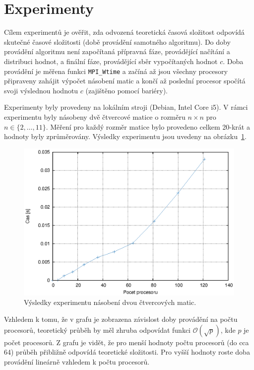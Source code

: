 \documentclass[a4paper,12pt]{article}
\begin{document}
\section{Experimenty}
Cílem experimentů je ověřit, zda odvozená teoretická časová složitost odpovídá skutečné časové složitosti (době 
provádění samotného algoritmu). Do doby provádění algoritmu není započítaná přípravná fáze, provádějící načítání a
distribuci hodnot, a finální fáze, provádějící sběr vypočítaných hodnot $c$. Doba provádění je měřena funkci \texttt{MPI\_Wtime} 
a začíná až jsou všechny procesory připraveny zahájit výpočet násobení matic a končí až poslední procesor spočítá svoji 
výslednou hodnotu $c$ (zajištěno pomocí bariéry).

Experimenty byly provedeny na lokálním stroji (Debian, Intel Core i5). V rámci experimentu byly násobeny dvě čtvercové matice
o rozměru $n\times n$ pro $n \in \{2,\dots,11\}$. Měření pro každý rozměr matice bylo provedeno celkem 20-krát a hodnoty byly 
zprůměrovány. Výsledky experimentu jsou uvedeny na obrázku~\ref{fig:exp1}.

\begin{figure}[h]
  \centering
  \includegraphics{Figures/quare.eps}
  \caption{Výsledky experimentu násobení dvou čtvercových matic.}
  \label{fig:exp1}
\end{figure}

Vzhledem k tomu, že v grafu je zobrazena závislost doby provádění na počtu procesorů, teoretický průběh by měl zhruba odpovídat
funkci $\mathcal{O}(\sqrt{p})$, kde $p$ je počet procesorů. Z grafu je vidět, že pro menší hodnoty počtu procesorů (do cca 64)
průběh přibližně odpovídá teoretické složitosti. Pro vyšší hodnoty roste doba provádění lineárně vzhledem k 
počtu procesorů.
\end{document}

